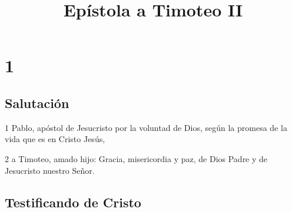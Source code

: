 
\title{Epístola a Timoteo II}

\chapter{1}

\section*{Salutación}

\par 1 Pablo, apóstol de Jesucristo por la voluntad de Dios, según la promesa de la vida que es en Cristo Jesús,
\par 2 a Timoteo, amado hijo: Gracia, misericordia y paz, de Dios Padre y de Jesucristo nuestro Señor.

\section*{Testificando de Cristo}

